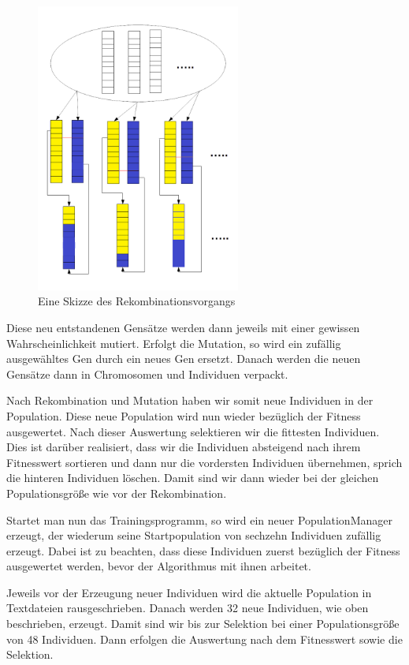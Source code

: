 \documentclass[
	12pt,
	a4paper,
	BCOR10mm,
	DIV14,
	headsepline,
	usegeometry,
]{scrreprt}
\begin{document}
\begin{figure}[h!]
	\centering
	\includegraphics[width = 0.6\textwidth]{VisualisierungRekombination.png}
	\caption{Eine Skizze des Rekombinationsvorgangs}
	\label{Rekombination}
\end{figure}

Diese neu entstandenen Gensätze werden dann jeweils mit einer gewissen Wahrscheinlichkeit mutiert.
Erfolgt die Mutation, so wird ein zufällig ausgewähltes Gen durch ein neues Gen ersetzt.
Danach werden die neuen Gensätze dann in Chromosomen und Individuen verpackt.

Nach Rekombination und Mutation haben wir somit neue Individuen in der Population.
Diese neue Population wird nun wieder bezüglich der Fitness ausgewertet.
Nach dieser Auswertung selektieren wir die fittesten Individuen.
Dies ist darüber realisiert, dass wir die Individuen absteigend nach ihrem Fitnesswert sortieren und dann nur die vordersten Individuen übernehmen, sprich die hinteren Individuen löschen.
Damit sind wir dann wieder bei der gleichen Populationsgröße wie vor der Rekombination.

Startet man nun das Trainingsprogramm, so wird ein neuer PopulationManager erzeugt, der wiederum seine Startpopulation von sechzehn Individuen zufällig erzeugt.
Dabei ist zu beachten, dass diese Individuen zuerst bezüglich der Fitness ausgewertet werden, bevor der Algorithmus mit ihnen arbeitet.

Jeweils vor der Erzeugung neuer Individuen wird die aktuelle Population in Textdateien rausgeschrieben.
Danach werden 32 neue Individuen, wie oben beschrieben, erzeugt.
Damit sind wir bis zur Selektion bei einer Populationsgröße von 48 Individuen.
Dann erfolgen die Auswertung nach dem Fitnesswert sowie die Selektion.
\end{document}
